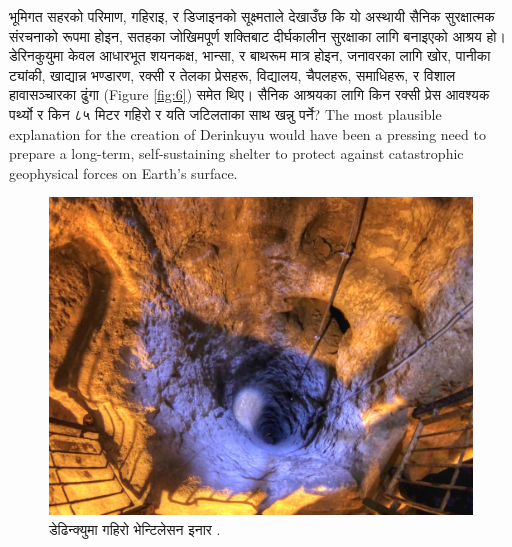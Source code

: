 \documentclass[10pt,twocolumn,letterpaper]{article}
\begin{document}
भूमिगत सहरको परिमाण, गहिराइ, र डिजाइनको सूक्ष्मताले देखाउँछ कि यो अस्थायी सैनिक सुरक्षात्मक संरचनाको रूपमा होइन, सतहका जोखिमपूर्ण शक्तिबाट दीर्घकालीन सुरक्षाका लागि बनाइएको आश्रय हो। डेरिनकुयुमा केवल आधारभूत शयनकक्ष, भान्सा, र बाथरूम मात्र होइन, जनावरका लागि खोर, पानीका ट्यांकी, खाद्यान्न भण्डारण, रक्सी र तेलका प्रेसहरू, विद्यालय, चैपलहरू, समाधिहरू, र विशाल हावासञ्चारका ढुंगा (Figure \ref{fig:6}) समेत थिए। सैनिक आश्रयका लागि किन रक्सी प्रेस आवश्यक पर्थ्यो र किन ८५ मिटर गहिरो र यति जटिलताका साथ खन्नु पर्ने?
The most plausible explanation for the creation of Derinkuyu would have been a pressing need to prepare a long-term, self-sustaining shelter to protect against catastrophic geophysical forces on Earth's surface.

\begin{figure}[t]
\begin{center}
   \includegraphics[width=1\linewidth]{derinkuyu-air.jpg}
\end{center}
   \caption{डेढिन्क्युमा गहिरो भेन्टिलेसन इनार \cite{53}.}
\label{fig:6}

\label{fig:onecol}
\end{figure}


\end{document}
